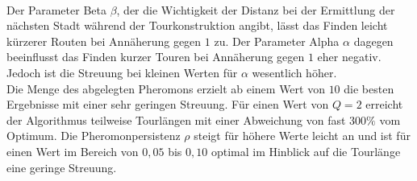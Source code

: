 \documentclass[doktyp=barbeit, sprache=german]{TUBAFarbeiten}
\begin{document}
\\Der Parameter Beta $\beta$, der die Wichtigkeit der Distanz bei der Ermittlung der nächsten Stadt während der Tourkonstruktion angibt, 
lässt das Finden leicht kürzerer Routen bei Annäherung gegen $1$ zu. Der Parameter Alpha $\alpha$ dagegen beeinflusst das Finden kurzer Touren bei Annäherung gegen $1$ eher negativ. Jedoch ist die Streuung bei kleinen Werten für $\alpha$ wesentlich höher. 
\\Die Menge des abgelegten Pheromons erzielt ab einem Wert von $10$ die besten Ergebnisse mit einer sehr geringen Streuung. Für einen Wert von $Q = 2$ erreicht der Algorithmus teilweise Tourlängen mit einer Abweichung von fast $300 \%$ vom Optimum. Die Pheromonpersistenz $\rho$ steigt für höhere Werte leicht an und ist für einen Wert im Bereich von $0,05$ bis $0,10$ optimal im Hinblick auf die Tourlänge eine geringe Streuung.
\end{document}
